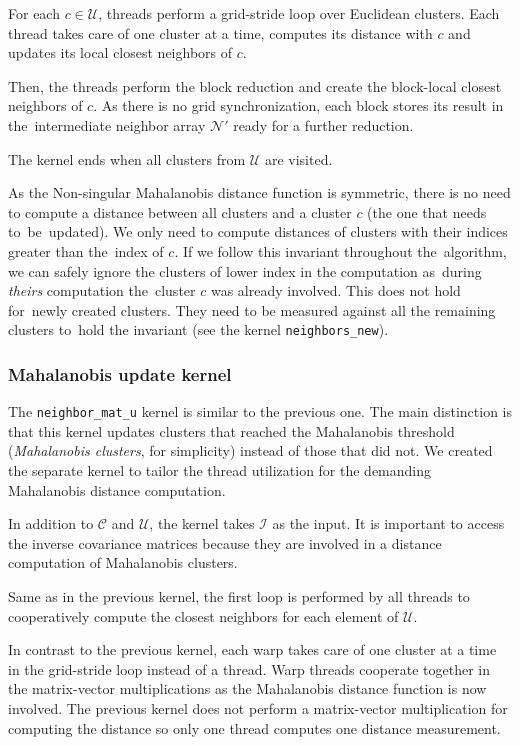 For each $c \in \mathcal{U}$, threads perform a grid-stride loop over Euclidean clusters. Each thread takes care of one cluster at a time, computes its distance with $c$ and updates its local closest neighbors of $c$.

Then, the threads perform the block reduction and create the block-local closest neighbors of $c$. As there is no grid synchronization, each block stores its result in the~intermediate neighbor array $\mathcal{N}'$ ready for a further reduction.

The kernel ends when all clusters from $\mathcal{U}$ are visited.

\begin{rem}
	As the Non-singular Mahalanobis distance function is symmetric, there is no need to compute a distance between all clusters and a cluster $c$ (the one that needs to~be~updated). We only need to compute distances of clusters with their indices greater than the~index of $c$. If we follow this invariant throughout the~algorithm, we can safely ignore the clusters of lower index in the computation as~during \emph{theirs} computation the~cluster $c$ was already involved. This does not hold for~newly created clusters. They need to be measured against all the remaining clusters to~hold the invariant (see the kernel \texttt{neighbors\_new}).
\end{rem}

\subsubsection{Mahalanobis update kernel} The \texttt{neighbor\_mat\_u} kernel is similar to the previous one. The main distinction is that this kernel updates clusters that reached the Mahalanobis threshold (\emph{Mahalanobis clusters}, for simplicity) instead of those that did not. We created the separate kernel to tailor the thread utilization for the demanding Mahalanobis distance computation.

In addition to $\mathcal{C}$ and $\mathcal{U}$, the kernel takes $\mathcal{I}$ as the input. It is important to access the inverse covariance matrices because they are involved in a distance computation of Mahalanobis clusters. 

Same as in the previous kernel, the first loop is performed by all threads to cooperatively compute the closest neighbors for each element of $\mathcal{U}$.

In contrast to the previous kernel, each warp takes care of one cluster at a time in the grid-stride loop instead of a thread. Warp threads cooperate together in the matrix-vector multiplications as the Mahalanobis distance function is now involved. The previous kernel does not perform a matrix-vector multiplication for computing the distance so only one thread computes one distance measurement.


